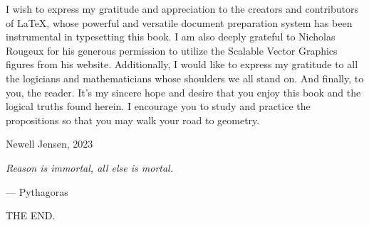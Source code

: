 \documentclass[twoside,11pt]{report}
\begin{document}
I wish to express my gratitude and appreciation to the creators and contributors of \LaTeX, whose powerful and versatile document preparation system has been instrumental in typesetting this book.  I am also deeply grateful to Nicholas Rougeux for his generous permission to utilize the Scalable Vector Graphics figures from his website.  Additionally, I would like to express my gratitude to all the logicians and mathematicians whose shoulders we all stand on. And finally, to you, the reader. It's my sincere hope and desire that you enjoy this book and the logical truths found herein. I encourage you to study and practice the propositions so that you may walk your {\color{cred}{o}}{\color{cblue}{w}}{\color{cyellow}{n}} road to geometry.

\hfill

\begin{flushright}
  Newell Jensen, 2023
\end{flushright}

\newpage

\vspace*{\fill}

\begin{center}
  \textit{Reason is immortal, all else is mortal.}

  \hspace{8em}--- Pythagoras
\end{center}

\vspace*{\fill}

\newpage

\tableofcontents

\newpage










\newpage

\thispagestyle{empty}
\vspace*{\fill}
\begin{center}
  \scshape{\LARGE{THE END.}}
\end{center}
\vspace*{\fill}
\end{document}
